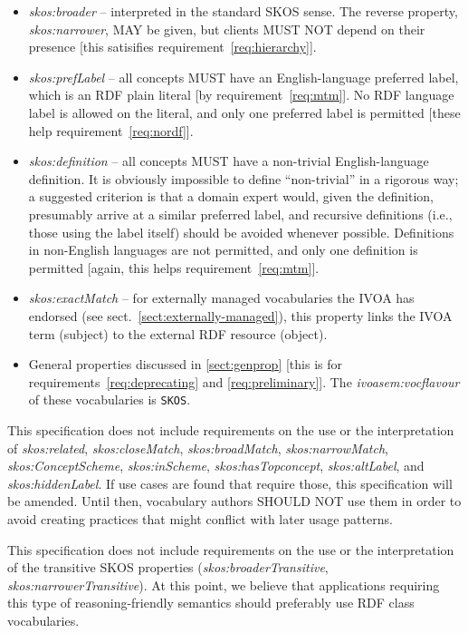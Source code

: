 \documentclass[11pt,a4paper]{ivoa}
\newcommand{\vocterm}[1]{\emph{\color{termcolor}#1}}
\begin{document}
\begin{itemize}
\item \vocterm{skos:broader} -- interpreted in the standard SKOS sense.
The reverse property, \vocterm{skos:narrower}, MAY be given, but clients
MUST NOT depend on their presence [this satisifies
requirement~\ref{req:hierarchy}].

\item \vocterm{skos:prefLabel} -- all concepts MUST have an
English-language preferred label, which is an RDF plain literal [by
requirement~\ref{req:mtm}].  No RDF language label is allowed on the
literal, and only one preferred label is permitted
[these help requirement~\ref{req:nordf}].

\item \vocterm{skos:definition} -- all concepts MUST have a non-trivial
English-language definition.  It is obviously impossible to define
``non-trivial'' in a rigorous way; a suggested criterion is that a
domain expert would, given the definition, presumably arrive at a
similar preferred label, and recursive definitions (i.e., those using
the label itself) should be avoided whenever possible.  Definitions in
non-English languages are not permitted, and only one definition is
permitted [again, this helps requirement~\ref{req:mtm}].

\item \vocterm{skos:exactMatch} -- for externally managed vocabularies
the IVOA has endorsed (see sect.~\ref{sect:externally-managed}), this
property links the IVOA term (subject) to the external RDF resource
(object).

\item General properties discussed in \ref{sect:genprop} [this is
for requirements~\ref{req:deprecating} and
\ref{req:preliminary}].  The \vocterm{ivoasem:vocflavour} of these
vocabularies is \verb|SKOS|.
\end{itemize}

This specification does not include requirements on the use or the
interpretation of \vocterm{skos:related}, 
\vocterm{skos:closeMatch}, \vocterm{skos:broadMatch},
\vocterm{skos:narrowMatch}, \vocterm{skos:ConceptScheme},
\vocterm{skos:inScheme}, \vocterm{skos:hasTopconcept},
\vocterm{skos:altLabel}, and \vocterm{skos:hiddenLabel}. If use cases
are found that require those, this specification will be amended.  Until
then, vocabulary authors SHOULD NOT use them in order to avoid creating
practices that might conflict with later usage patterns.

This specification does not include requirements on the use or the
interpretation of the transitive SKOS properties
(\vocterm{skos:broaderTransitive}, \vocterm{skos:narrowerTransitive}).
At this point, we believe that applications requiring this type of
reasoning-friendly semantics should preferably use RDF class
vocabularies.
\end{document}
